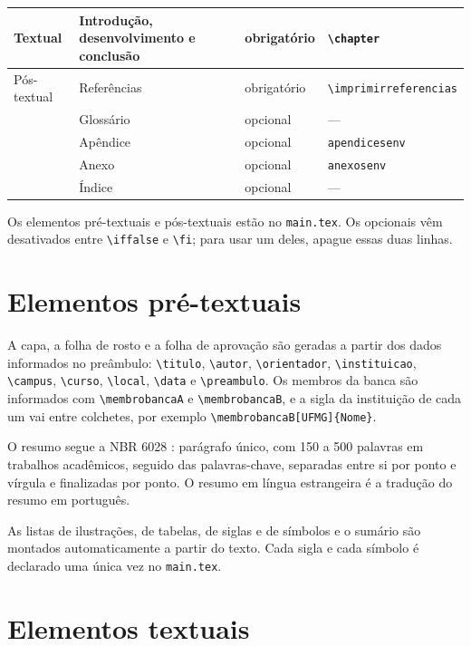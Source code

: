 \begin{quadro}[htbp]
\begin{tabular}{p{}p{}p{}p{}}
		\midrule
		Textual & Introdução, desenvolvimento e conclusão & obrigatório & \verb|\chapter| \\
		\midrule
		Pós-textual & Referências & obrigatório & \verb|\imprimirreferencias| \\
		& Glossário & opcional & --- \\
		& Apêndice & opcional & \texttt{apendicesenv} \\
		& Anexo & opcional & \texttt{anexosenv} \\
		& Índice & opcional & --- \\
		\bottomrule
	\end{tabular}
\end{quadro}

Os elementos pré-textuais e pós-textuais estão no \texttt{main.tex}. Os opcionais vêm desativados entre \verb|\iffalse| e \verb|\fi|; para usar um deles, apague essas duas linhas.

\section{Elementos pré-textuais}\label{sec:pre-textuais}

A capa, a folha de rosto e a folha de aprovação são geradas a partir dos dados informados no preâmbulo: \verb|\titulo|, \verb|\autor|, \verb|\orientador|, \verb|\instituicao|, \verb|\campus|, \verb|\curso|, \verb|\local|, \verb|\data| e \verb|\preambulo|. Os membros da banca são informados com \verb|\membrobancaA| e \verb|\membrobancaB|, e a sigla da instituição de cada um vai entre colchetes, por exemplo \verb|\membrobancaB[UFMG]{Nome}|.

O resumo segue a NBR 6028 \cite{abnt6028}: parágrafo único, com 150 a 500 palavras em trabalhos acadêmicos, seguido das palavras-chave, separadas entre si por ponto e vírgula e finalizadas por ponto. O resumo em língua estrangeira é a tradução do resumo em português.

As listas de ilustrações, de tabelas, de siglas e de símbolos e o sumário \cite{abnt6027} são montados automaticamente a partir do texto. Cada sigla e cada símbolo é declarado uma única vez no \texttt{main.tex}.

\section{Elementos textuais}\label{sec:textuais}

